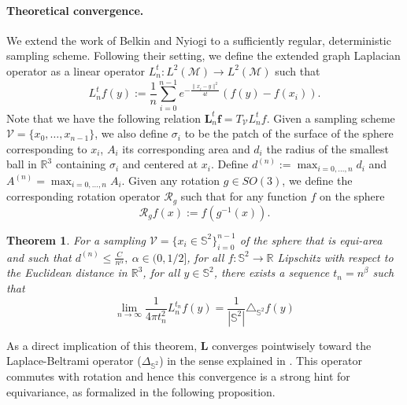 \documentclass{article} %
\newtheorem{theorem}{Theorem}[section]
\renewcommand{\b}[1]{{\bm{#1}}}  %
\newcommand{\R}{\mathbb{R}}
\renewcommand{\S}{\mathbb{S}}
\newcommand{\V}{\mathcal{V}}  %
\newcommand{\mart}[1]{{\color[rgb]{.9,.5,.3}{#1}}}
\newcommand{\linefrac}[2]{
    {#1/#2}
}
\begin{document}
\paragraph{Theoretical convergence.}
We extend the work of Belkin and Nyiogi to a sufficiently regular, deterministic sampling scheme. \mart{Here we insert the definition of the extended graph laplacian and of the rotation operator Rg} Following their setting, we define the extended graph Laplacian operator as a linear operator $L_n^t: L^{2}(\mathcal{M}) \rightarrow L^{2}(\mathcal{M})$ such that
	\begin{equation}
	\label{eq:Heat Kernel Graph Laplacian operator}
	 L_n^tf(y) := \frac{1}{n}\sum_{i=0}^{n-1} e^{ -\frac{\|x_i-y\|^2}{4t}} \left(f(y)-f(x_i)\right).
	\end{equation}
Note that we have the following relation $\b{L}_n^t \b{f} = T_\V L_n^t f$.
Given a sampling scheme $\V = \{x_0, \dots, x_{n-1}\}$, we also define $\sigma_i$ to be the patch of the surface of the sphere corresponding to $x_i$, $A_i$ its corresponding area and $d_i$ the radius of the smallest ball in $\R^3$ containing $\sigma_i$ and centered at $x_i$. Define $d^{(n)} := \max_{i=0, \dots, n}d_i$ and $A^{(n)}=\max_{i=0, \dots, n}A_i$. Given any rotation $g\in SO(3)$, we define the corresponding rotation operator $\mathcal R_g$ such that for any function $f$ on the sphere 
\begin{equation}\label{eq:rotation operator}
\mathcal R_g f(x) := f(g^{-1}(x)).
\end{equation}
\begin{theorem}
	For a sampling $\V = \{x_i\in\S^2\}_{i=0}^{n-1}$ of the sphere that is equi-area and such that $d^{(n)} \leq \frac{C}{n^\alpha}, \ \alpha\in (0,\linefrac{1}{2}]$, for all $f: \S^2 \rightarrow \R$ Lipschitz with respect to the Euclidean distance in $\R^3$, for all $y\in\S^2$, there exists a sequence $t_n = n^\beta$ such that 
	\begin{equation*}
		\lim_{n\to\infty}\frac{1}{4\pi t_n^2} L_n^{t_n}f(y) = \frac{1}{|\S^2|}\triangle_{\S^2}f(y)
	\end{equation*} 
	\label{theo:pointwise convergence for a regular sampling}
\end{theorem}
As a direct implication of this theorem, $\b{L}$ converges pointwisely toward the Laplace-Beltrami operator ($\Delta_{\S^2}$) in the sense explained in \cite{belkin2007convergence}. \mart{here we insert the link between consistency and equivariance} This operator commutes with rotation and hence this convergence is a strong hint for equivariance, as formalized in the following proposition.
\end{document}
